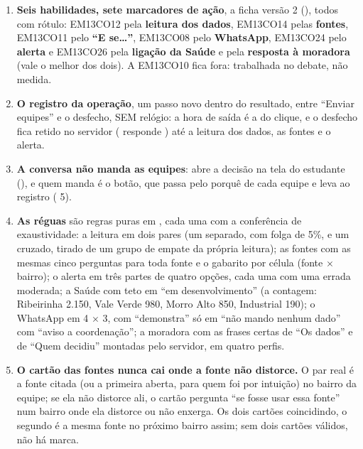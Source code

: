\begin{enumerate}
  \item \textbf{Seis habilidades, sete marcadores de ação}, a ficha versão 2
    (), todos com rótulo: EM13CO12 pela
    \textbf{leitura dos dados}, EM13CO14 pelas \textbf{fontes}, EM13CO11 pelo
    \textbf{\enquote{E se\ldots}}, EM13CO08 pelo \textbf{WhatsApp}, EM13CO24
    pelo \textbf{alerta} e EM13CO26 pela \textbf{ligação da Saúde} e pela
    \textbf{resposta à moradora} (vale o melhor dos dois). A EM13CO10 fica
    fora: trabalhada no debate, não medida.
  \item \textbf{O registro da operação}, um passo novo dentro do resultado,
    entre \enquote{Enviar equipes} e o desfecho, SEM relógio: a hora de saída é
    a do clique, e o desfecho fica retido no servidor
    ( responde ) até a
    leitura dos dados, as fontes e o alerta.
  \item \textbf{A conversa não manda as equipes}: 
    abre a decisão na tela do estudante (), e quem manda é o
    botão, que passa pelo porquê de cada equipe e leva ao registro
    ( 5).
  \item \textbf{As réguas} são regras puras em , cada uma
    com a conferência de exaustividade: a leitura em dois pares (um separado,
    com folga de 5\%, e um cruzado, tirado de um grupo de empate da própria
    leitura); as fontes com as mesmas cinco perguntas para toda fonte e o
    gabarito por célula (fonte $\times$ bairro); o alerta em três partes de
    quatro opções, cada uma com uma errada moderada; a Saúde com teto em
    \enquote{em desenvolvimento} (a contagem: Ribeirinha 2.150, Vale Verde
    980, Morro Alto 850, Industrial 190); o WhatsApp em 4 $\times$ 3, com
    \enquote{demonstra} só em \enquote{não mando nenhum dado} com
    \enquote{aviso a coordenação}; a moradora com as frases certas de
    \enquote{Os dados} e de \enquote{Quem decidiu} montadas pelo servidor,
    em quatro perfis.
  \item \textbf{O cartão das fontes nunca cai onde a fonte não distorce.} O
    par real é a fonte citada (ou a primeira aberta, para quem foi por
    intuição) no bairro da equipe; se ela não distorce ali, o cartão pergunta
    \enquote{se fosse usar essa fonte} num bairro onde ela distorce ou não
    enxerga. Os dois cartões coincidindo, o segundo é a mesma fonte no
    próximo bairro assim; sem dois cartões válidos, não há marca.

\end{enumerate}
